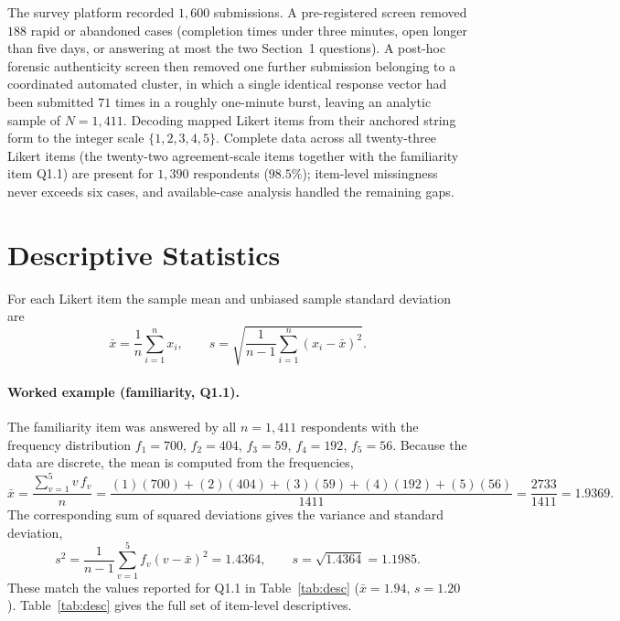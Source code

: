 The survey platform recorded $1{,}600$ submissions. A pre-registered screen removed $188$ rapid or abandoned cases (completion times under three minutes, open longer than five days, or answering at most the two Section~1 questions). A post-hoc forensic authenticity screen then removed one further submission belonging to a coordinated automated cluster, in which a single identical response vector had been submitted $71$ times in a roughly one-minute burst, leaving an analytic sample of $N=1{,}411$. Decoding mapped Likert items from their anchored string form to the integer scale $\{1,2,3,4,5\}$. Complete data across all twenty-three Likert items (the twenty-two agreement-scale items together with the familiarity item Q1.1) are present for $1{,}390$ respondents ($98.5\%$); item-level missingness never exceeds six cases, and available-case analysis handled the remaining gaps.

\section{Descriptive Statistics}

For each Likert item the sample mean and unbiased sample standard deviation are
\begin{equation}
  \bar{x} = \frac{1}{n}\sum_{i=1}^{n} x_i,
  \qquad
  s = \sqrt{\frac{1}{n-1}\sum_{i=1}^{n}\left(x_i-\bar{x}\right)^2}.
\end{equation}

\paragraph{Worked example (familiarity, Q1.1).} The familiarity item was answered by all $n=1{,}411$ respondents with the frequency distribution $f_1=700$, $f_2=404$, $f_3=59$, $f_4=192$, $f_5=56$. Because the data are discrete, the mean is computed from the frequencies,
\begin{equation}
  \bar{x} = \frac{\sum_{v=1}^{5} v\,f_v}{n}
          = \frac{(1)(700)+(2)(404)+(3)(59)+(4)(192)+(5)(56)}{1411}
          = \frac{2733}{1411} = 1.9369 .
\end{equation}
The corresponding sum of squared deviations gives the variance and standard deviation,
\begin{equation}
  s^2 = \frac{1}{n-1}\sum_{v=1}^{5} f_v\left(v-\bar{x}\right)^2 = 1.4364,
  \qquad s = \sqrt{1.4364} = 1.1985 .
\end{equation}
These match the values reported for Q1.1 in Table~\ref{tab:desc} ($\bar{x}=1.94$, $s=1.20$). Table~\ref{tab:desc} gives the full set of item-level descriptives.

